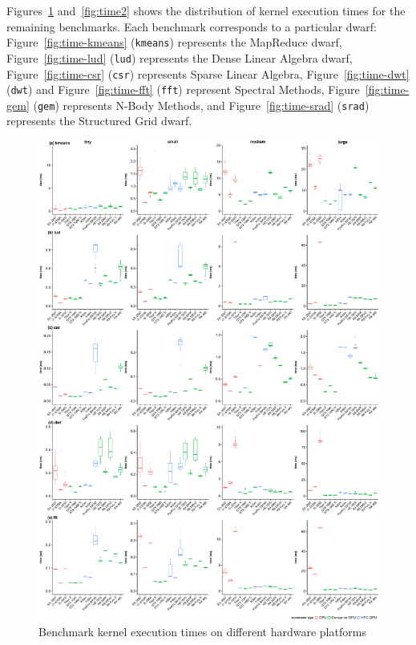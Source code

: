 \documentclass[../document.tex]{subfiles}
\begin{document}
Figures~\ref{fig:time} and~\ref{fig:time2} shows the distribution of kernel execution times for the remaining benchmarks.
Each benchmark corresponds to a particular dwarf: 
Figure~\ref{fig:time-kmeans} ({\tt kmeans}) represents the MapReduce dwarf,
Figure~\ref{fig:time-lud} ({\tt lud}) represents the Dense Linear Algebra dwarf,
Figure~\ref{fig:time-csr} ({\tt csr}) represents Sparse Linear Algebra, 
Figure~\ref{fig:time-dwt} ({\tt dwt}) and Figure~\ref{fig:time-fft} ({\tt fft}) represent Spectral Methods,
Figure~\ref{fig:time-gem} ({\tt gem}) represents N-Body Methods, 
and Figure~\ref{fig:time-srad} ({\tt srad}) represents the Structured Grid dwarf.

\begin{figure}
    \centering
    \includegraphics[width=\textwidth,keepaspectratio]{figures/new-time-results/generate_main_4x5_bandwplot}
    \caption{Benchmark kernel execution times on different hardware platforms}
    \label{fig:time}
\end{figure}
\end{document}
